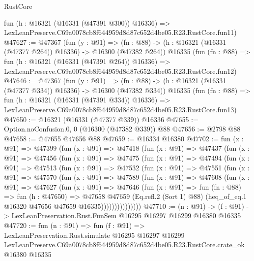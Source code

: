 \begin{lexlean}{RustCore}
\begin{coremodule}
    fun (h : @16321 (@16331 (@47391 @300)) @16336) =>
    LexLeanPreserve.C69a0078cb8f644959d8d87c652d4be05.R23.RustCore.fun11)
@47627 := @47367
    (fun (y : @91) =>
    (fn : @88) -> (h : @16321 (@16331 (@47377 @264)) @16336) -> @16300 (@47382 @264))
    @16335
    (fun (fn : @88) =>
    fun (h : @16321 (@16331 (@47391 @264)) @16336) =>
    LexLeanPreserve.C69a0078cb8f644959d8d87c652d4be05.R23.RustCore.fun12)
@47646 := @47367
    (fun (y : @91) =>
    (fn : @88) -> (h : @16321 (@16331 (@47377 @334)) @16336) -> @16300 (@47382 @334))
    @16335
    (fun (fn : @88) =>
    fun (h : @16321 (@16331 (@47391 @334)) @16336) =>
    LexLeanPreserve.C69a0078cb8f644959d8d87c652d4be05.R23.RustCore.fun13)
@47650 := @16321 (@16331 (@47377 @339)) @16336
@47655 := Option.noConfusion.{0, 0} (@16300 (@47382 @339)) @88
@47656 := @2798 @88
@47658 := @47655 @47656 @88
@47659 := @16334 @16380
@47702 := fun (x : @91) =>
  @47399
    (fun (x : @91) =>
    @47418
      (fun (x : @91) =>
      @47437
        (fun (x : @91) =>
        @47456
          (fun (x : @91) =>
          @47475
            (fun (x : @91) =>
            @47494
              (fun (x : @91) =>
              @47513
                (fun (x : @91) =>
                @47532
                  (fun (x : @91) =>
                  @47551
                    (fun (x : @91) =>
                    @47570
                      (fun (x : @91) =>
                      @47589
                        (fun (x : @91) =>
                        @47608
                          (fun (x : @91) =>
                          @47627
                            (fun (x : @91) =>
                            @47646
                              (fun (x : @91) =>
                              fun (fn : @88) =>
                              fun (h : @47650) =>
                              @47658
                                @47659
                                (Eq.refl.{2} (Sort 1) @88)
                                (heq_of_eq.{1} @16320 @47656 @47659 @16335)))))))))))))))
@47710 := (n : @91) ->
  (f : @91) -> LexLeanPreservation.Rust.FunSem @16295 @16297 @16299 @16380 @16335
@47720 := fun (n : @91) =>
  fun (f : @91) =>
  LexLeanPreservation.Rust.simulate
    @16295
    @16297
    @16299
    LexLeanPreserve.C69a0078cb8f644959d8d87c652d4be05.R23.RustCore.crate_ok
    @16380
    @16335
\end{coremodule}
\end{lexlean}
